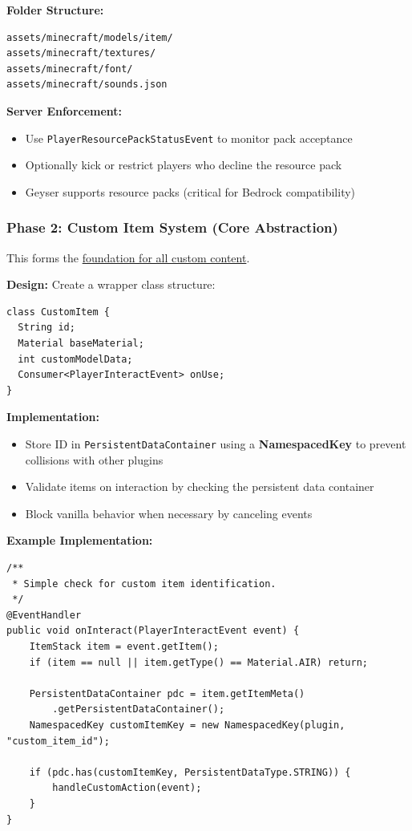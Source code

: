 \documentclass{article}
\begin{document}
\textbf{Folder Structure:}
\begin{verbatim}
assets/minecraft/models/item/
assets/minecraft/textures/
assets/minecraft/font/
assets/minecraft/sounds.json
\end{verbatim}

\textbf{Server Enforcement:}
\begin{itemize}
    \item Use \texttt{PlayerResourcePackStatusEvent} to monitor pack acceptance
    \item Optionally kick or restrict players who decline the resource pack
    \item Geyser supports resource packs (critical for Bedrock compatibility)
\end{itemize}

\subsubsection{Phase 2: Custom Item System (Core Abstraction)}

This forms the \uline{foundation for all custom content}.

\textbf{Design:}
Create a wrapper class structure:

\begin{verbatim}
class CustomItem {
  String id;
  Material baseMaterial;
  int customModelData;
  Consumer<PlayerInteractEvent> onUse;
}
\end{verbatim}

\textbf{Implementation:}
\begin{itemize}
    \item Store ID in \texttt{PersistentDataContainer} using a \textbf{NamespacedKey} to prevent collisions with other plugins
    \item Validate items on interaction by checking the persistent data container
    \item Block vanilla behavior when necessary by canceling events
\end{itemize}

\textbf{Example Implementation:}
\begin{verbatim}
/**
 * Simple check for custom item identification.
 */
@EventHandler
public void onInteract(PlayerInteractEvent event) {
    ItemStack item = event.getItem();
    if (item == null || item.getType() == Material.AIR) return;
    
    PersistentDataContainer pdc = item.getItemMeta()
        .getPersistentDataContainer();
    NamespacedKey customItemKey = new NamespacedKey(plugin, "custom_item_id");
    
    if (pdc.has(customItemKey, PersistentDataType.STRING)) {
        handleCustomAction(event);
    }
}
\end{verbatim}
\end{document}
